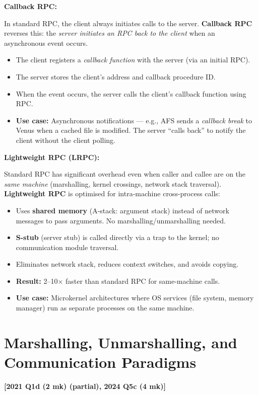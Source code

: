 \documentclass[11pt,a4paper]{article}
\newcommand{\qref}[1]{\textbf{\textcolor{examblue}{[#1]}}}
\newcommand{\mk}[1]{\textcolor{slidegray}{\small(#1 mk)}}
\newcommand{\key}[1]{\textbf{\textcolor{keyred}{#1}}}
\begin{document}
\begin{answerbox}
\textbf{Callback RPC:}

In standard RPC, the client always initiates calls to the server. \key{Callback RPC} reverses this: the \emph{server initiates an RPC back to the client} when an asynchronous event occurs.

\begin{itemize}
  \item The client registers a \emph{callback function} with the server (via an initial RPC).
  \item The server stores the client's address and callback procedure ID.
  \item When the event occurs, the server calls the client's callback function using RPC.
  \item \textbf{Use case:} Asynchronous notifications --- e.g., AFS sends a \emph{callback break} to Venus when a cached file is modified. The server ``calls back'' to notify the client without the client polling.
\end{itemize}

\textbf{Lightweight RPC (LRPC):}

Standard RPC has significant overhead even when caller and callee are on the \emph{same machine} (marshalling, kernel crossings, network stack traversal). \key{Lightweight RPC} is optimised for intra-machine cross-process calls:

\begin{itemize}
  \item Uses \textbf{shared memory} (A-stack: argument stack) instead of network messages to pass arguments. No marshalling/unmarshalling needed.
  \item \textbf{S-stub} (server stub) is called directly via a trap to the kernel; no communication module traversal.
  \item Eliminates network stack, reduces context switches, and avoids copying.
  \item \textbf{Result:} 2--10$\times$ faster than standard RPC for same-machine calls.
  \item \textbf{Use case:} Microkernel architectures where OS services (file system, memory manager) run as separate processes on the same machine.
\end{itemize}
\end{answerbox}

\section{Marshalling, Unmarshalling, and Communication Paradigms}
\qref{2021 Q1d \mk{2} (partial), 2024 Q5c \mk{4}}
\end{document}
